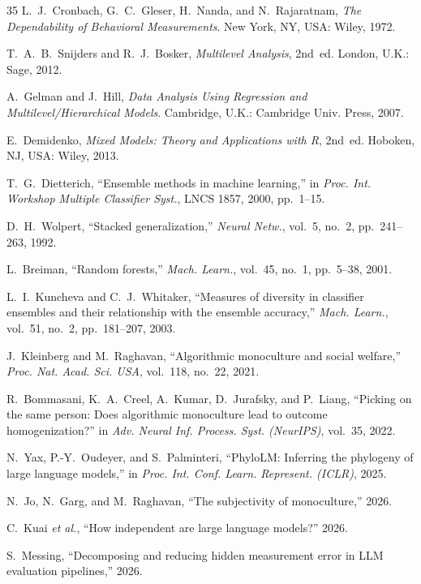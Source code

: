 \documentclass{ieeeaccess}
\theoremstyle{definition}
\theoremstyle{plain}
\begin{document}
\begin{thebibliography}{35}
 L.~J.~Cronbach, G.~C.~Gleser, H.~Nanda, and
N.~Rajaratnam, \emph{The Dependability of Behavioral Measurements}. New York, NY,
USA: Wiley, 1972.

 T.~A.~B.~Snijders and R.~J.~Bosker, \emph{Multilevel
Analysis}, 2nd~ed. London, U.K.: Sage, 2012.

 A.~Gelman and J.~Hill, \emph{Data Analysis Using Regression
and Multilevel/Hierarchical Models}. Cambridge, U.K.: Cambridge Univ. Press, 2007.

 E.~Demidenko, \emph{Mixed Models: Theory and Applications
with R}, 2nd~ed. Hoboken, NJ, USA: Wiley, 2013.

 T.~G.~Dietterich, ``Ensemble methods in machine
learning,'' in \emph{Proc. Int. Workshop Multiple Classifier Syst.}, LNCS 1857,
2000, pp.~1--15.

 D.~H.~Wolpert, ``Stacked generalization,'' \emph{Neural
Netw.}, vol.~5, no.~2, pp.~241--263, 1992.

 L.~Breiman, ``Random forests,'' \emph{Mach. Learn.},
vol.~45, no.~1, pp.~5--38, 2001.

 L.~I.~Kuncheva and C.~J.~Whitaker, ``Measures of
diversity in classifier ensembles and their relationship with the ensemble
accuracy,'' \emph{Mach. Learn.}, vol.~51, no.~2, pp.~181--207, 2003.

 J.~Kleinberg and M.~Raghavan, ``Algorithmic monoculture
and social welfare,'' \emph{Proc. Nat. Acad. Sci. USA}, vol.~118, no.~22,
2021.

 R.~Bommasani, K.~A.~Creel, A.~Kumar, D.~Jurafsky, and
P.~Liang, ``Picking on the same person: Does algorithmic monoculture lead to
outcome homogenization?'' in \emph{Adv. Neural Inf. Process. Syst. (NeurIPS)},
vol.~35, 2022.

 N.~Yax, P.-Y.~Oudeyer, and S.~Palminteri, ``PhyloLM:
Inferring the phylogeny of large language models,'' in \emph{Proc. Int. Conf.
Learn. Represent. (ICLR)}, 2025.

 N.~Jo, N.~Garg, and M.~Raghavan, ``The subjectivity of
monoculture,'' 2026.

 C.~Kuai \emph{et al.}, ``How independent are large language
models?'' 2026.

 S.~Messing, ``Decomposing and reducing hidden measurement
error in LLM evaluation pipelines,'' 2026.


\end{thebibliography}
\end{document}
